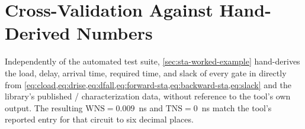 \section{Cross-Validation Against Hand-Derived Numbers}
\label{sec:test-handcheck}

Independently of the automated test suite, \cref{sec:sta-worked-example}
hand-derives the load, delay, arrival time, required time, and slack of
every gate in  directly from
\cref{eq:cload,eq:drise,eq:dfall,eq:forward-sta,eq:backward-sta,eq:slack}
and the library's published / characterization
data, without reference to the tool's own output. The resulting
$\mathrm{WNS} = 0.009$~ns and $\mathrm{TNS} = 0$~ns match the tool's
reported  entry for that circuit to six decimal
places.
